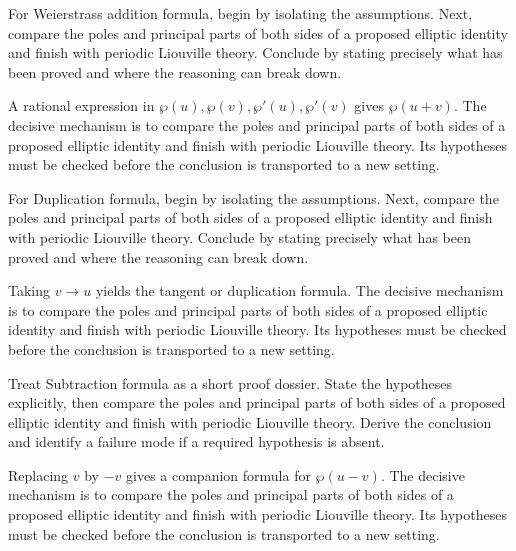 \begin{problem}\label{prob:iv30-problem-03}
For Weierstrass addition formula, begin by isolating the assumptions. Next, compare the poles and principal parts of both sides of a proposed elliptic identity and finish with periodic Liouville theory. Conclude by stating precisely what has been proved and where the reasoning can break down.
\end{problem}
\begin{solution}
A rational expression in $\wp(u),\wp(v),\wp'(u),\wp'(v)$ gives $\wp(u+v)$. The decisive mechanism is to compare the poles and principal parts of both sides of a proposed elliptic identity and finish with periodic Liouville theory. Its hypotheses must be checked before the conclusion is transported to a new setting.
\end{solution}

\begin{problem}\label{prob:iv30-problem-04}
For Duplication formula, begin by isolating the assumptions. Next, compare the poles and principal parts of both sides of a proposed elliptic identity and finish with periodic Liouville theory. Conclude by stating precisely what has been proved and where the reasoning can break down.
\end{problem}
\begin{solution}
Taking $v\to u$ yields the tangent or duplication formula. The decisive mechanism is to compare the poles and principal parts of both sides of a proposed elliptic identity and finish with periodic Liouville theory. Its hypotheses must be checked before the conclusion is transported to a new setting.
\end{solution}

\begin{problem}\label{prob:iv30-problem-05}
Treat Subtraction formula as a short proof dossier. State the hypotheses explicitly, then compare the poles and principal parts of both sides of a proposed elliptic identity and finish with periodic Liouville theory. Derive the conclusion and identify a failure mode if a required hypothesis is absent.
\end{problem}
\begin{solution}
Replacing $v$ by $-v$ gives a companion formula for $\wp(u-v)$. The decisive mechanism is to compare the poles and principal parts of both sides of a proposed elliptic identity and finish with periodic Liouville theory. Its hypotheses must be checked before the conclusion is transported to a new setting.
\end{solution}

